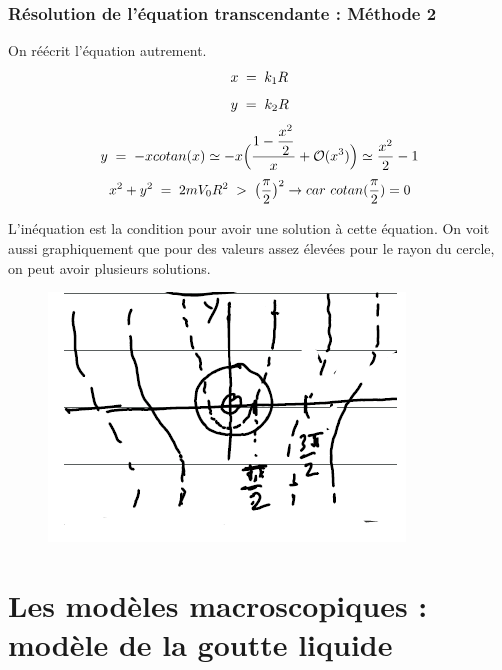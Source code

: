 \subsubsection{Résolution de l'équation transcendante : Méthode 2}
On réécrit l'équation autrement.
\begin{equation*}
    x \; = \; k_1R
\end{equation*}
\begin{equation*}
    y \; = \; k_2 R
\end{equation*}
\begin{equation*}
    y \; = \; -x cotan(x) \simeq -x \Big( \dfrac{1-\dfrac{x^2}{2}}{x} + \mathcal{O}(x^3) \Big) \simeq \dfrac{x^2}{2} -1
\end{equation*}
\begin{equation*}
    x^2 + y^2 \eq 2mV_0R^2 \; > \; \big(\dfrac{\pi}{2}\big)^2 \rightarrow car\ cotan(\dfrac{\pi}{2}) = 0
\end{equation*}

L'inéquation est la condition pour avoir une solution à cette équation. On voit aussi graphiquement que pour des valeurs assez élevées pour le rayon du cercle, on peut avoir plusieurs solutions.
\begin{figure}[H]
    \centering
    \includegraphics[scale=1.2]{Images4/EqTranscendante.PNG}
\end{figure}







\section{Les modèles macroscopiques : modèle de la goutte liquide}


